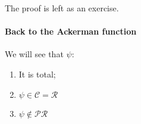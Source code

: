 The proof is left as an exercise.

\paragraph{\textbf{Back to the Ackerman function}}

We will see that $\psi$:
\begin{enumerate}
\item It is total;
\item $ \psi \in \mathcal{C} = \mathcal{R} $
\item $ \psi \not \in \mathcal{PR} $
\end{enumerate}





